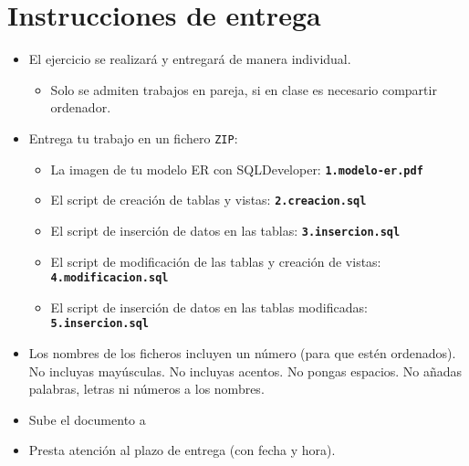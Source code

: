 \section{Instrucciones de entrega}
\begin{itemize}
\item El ejercicio se realizará y entregará de manera individual.
  \begin{itemize}
  \item Solo se admiten trabajos en pareja, si en clase es necesario compartir ordenador.
  \end{itemize}
\item Entrega tu trabajo en un fichero \texttt{ZIP}:
  \begin{itemize}
  \item La imagen de tu modelo ER  con SQLDeveloper: \texttt{\textbf{1.modelo-er.pdf}}
  \item El script de creación de tablas y vistas: \texttt{\textbf{2.creacion.sql}}
  \item El script de inserción de datos en las tablas: \texttt{\textbf{3.insercion.sql}}
  \item El script de modificación de las tablas y creación de vistas: \texttt{\textbf{4.modificacion.sql}}
  \item El script de inserción de datos en las tablas modificadas: \texttt{\textbf{5.insercion.sql}}
  \end{itemize}
\item Los nombres de los ficheros incluyen un número (para que estén ordenados). No incluyas mayúsculas. No incluyas acentos. No pongas espacios. No añadas palabras, letras ni números a los nombres.
\item Sube el documento a 
\item Presta atención al plazo de entrega (con fecha y hora).
  
\end{itemize}





